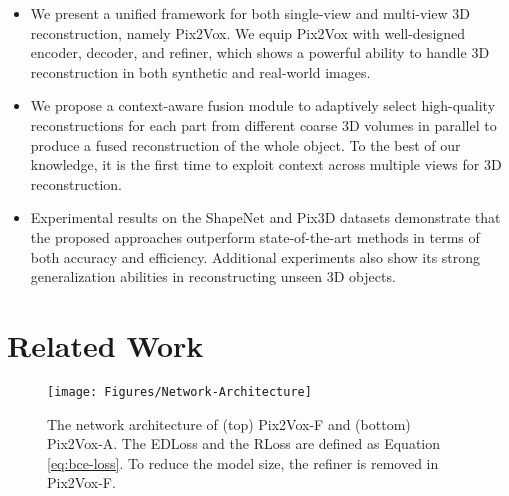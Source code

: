 \documentclass[10pt,twocolumn,letterpaper]{article}
\begin{document}
\begin{itemize}
  \vspace{-1.5 mm}
  \item We present a unified framework for both single-view and multi-view 3D reconstruction, namely Pix2Vox. We equip Pix2Vox with well-designed encoder, decoder, and refiner, which shows a powerful ability to handle 3D reconstruction in both synthetic and real-world images.
  \vspace{-1.5 mm}
  \item We propose a context-aware fusion module to adaptively select high-quality reconstructions for each part from different coarse 3D volumes in parallel to produce a fused reconstruction of the whole object. To the best of our knowledge, it is the first time to exploit context across multiple views for 3D reconstruction.
  \vspace{-1.5 mm}
  \item Experimental results on the ShapeNet \cite{DBLP:conf/cvpr/WuSKYZTX15} and Pix3D \cite{DBLP:conf/cvpr/Sun0ZZZXTF18} datasets demonstrate that the proposed approaches outperform state-of-the-art methods in terms of both accuracy and efficiency. Additional experiments also show its strong generalization abilities in reconstructing unseen 3D objects.
\end{itemize}

\section{Related Work}

\begin{figure*}
  \centering
  \resizebox{\linewidth}{!} {
    \texttt{[image: Figures/Network-Architecture]}
  }
  \caption{The network architecture of (top) Pix2Vox-F and (bottom) Pix2Vox-A. The EDLoss and the RLoss are defined as Equation \ref{eq:bce-loss}. To reduce the model size, the refiner is removed in Pix2Vox-F.}
  \label{fig:network}
  \vspace{-2 mm}
\end{figure*}
\end{document}
